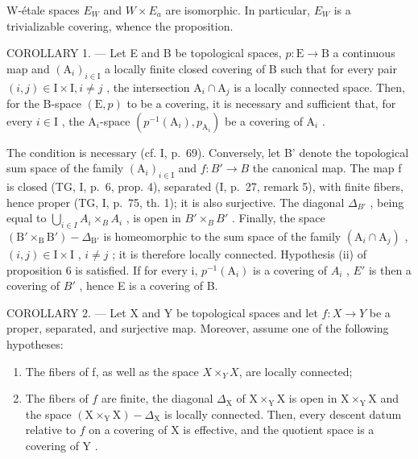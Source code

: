 W-étale spaces \(E_{W}\) and \(W \times E_{a}\) are isomorphic. In particular, \(E_{W}\) is a trivializable covering, whence the proposition.

COROLLARY 1. --- Let E and B be topological spaces, \(p\colon\mathrm{E}\to\mathrm{B}\) a continuous map and \((\mathrm{A}_{i})_{i\in\mathrm{I}}\) a locally finite closed covering of B such that for every pair \((i,j)\in\mathrm{I}\times\mathrm{I}, i\neq j\) , the intersection \(\mathrm{A}_{i}\cap\mathrm{A}_{j}\) is a locally connected space. Then, for the B-space \((\mathrm{E},p)\) to be a covering, it is necessary and sufficient that, for every \(i\in\mathrm{I}\) , the \(\mathrm{A}_{i} \)-space \((p^{-1}(\mathrm{A}_{i}),p_{\mathrm{A}_{i}})\) be a covering of \(\mathrm{A}_{i}\) .

The condition is necessary (cf. I, p.~69). Conversely, let B' denote the topological sum space of the family \((\mathrm{A}_{i})_{i\in\mathrm{I}}\) and \(f\colon B'\to B\) the canonical map. The map f is closed (TG, I, p.~6, prop. 4), separated (I, p.~27, remark 5), with finite fibers, hence proper (TG, I, p.~75, th. 1); it is also surjective. The diagonal \(\Delta_{B'}\) , being equal to \(\bigcup_{i\in I}A_{i}\times_{B}A_{i}\) , is open in \(B'\times_{B}B'\) . Finally, the space \((\mathrm{B}'\times_{\mathrm{B}}\mathrm{B}')-\Delta_{\mathrm{B'}}\) is homeomorphic to the sum space of the family \((\mathrm{A}_{i}\cap\mathrm{A}_{j})\) , \((i,j)\in\mathrm{I}\times\mathrm{I}\) , \(i\neq j\) ; it is therefore locally connected. Hypothesis (ii) of proposition 6 is satisfied. If for every i, \(p^{-1}(\mathrm{A}_{i})\) is a covering of \(A_{i}\) , \(E'\) is then a covering of \(B'\) , hence E is a covering of B.

COROLLARY 2. --- Let X and Y be topological spaces and let \(f\colon X \to Y\) be a proper, separated, and surjective map. Moreover, assume one of the following hypotheses:

\begin{enumerate}
\def\labelenumi{(\roman{enumi})}
\item
  The fibers of f, as well as the space \(X\times_Y X\), are locally connected;
\item
  The fibers of \(f\) are finite, the diagonal \(\Delta_{\mathrm{X}}\) of \(\mathrm{X} \times_{\mathrm{Y}} \mathrm{X}\) is open in \(\mathrm{X} \times_{\mathrm{Y}} \mathrm{X}\) and the space \((\mathrm{X} \times_{\mathrm{Y}} \mathrm{X}) - \Delta_{\mathrm{X}}\) is locally connected. Then, every descent datum relative to \(f\) on a covering of \(\mathrm{X}\) is effective, and the quotient space is a covering of \(\mathrm{Y}\) .
\end{enumerate}

